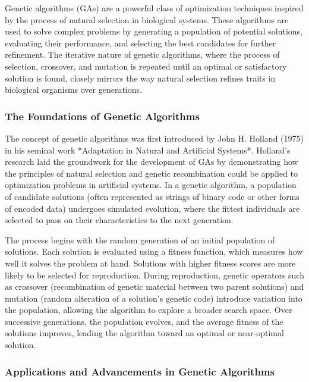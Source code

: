 \documentclass[12pt,twoside]{article}
\begin{document}
Genetic algorithms (GAs) are a powerful class of optimization techniques inspired by the process of natural selection in biological systems. These algorithms are used to solve complex problems by generating a population of potential solutions, evaluating their performance, and selecting the best candidates for further refinement. The iterative nature of genetic algorithms, where the process of selection, crossover, and mutation is repeated until an optimal or satisfactory solution is found, closely mirrors the way natural selection refines traits in biological organisms over generations.

\subsubsection{The Foundations of Genetic Algorithms}

The concept of genetic algorithms was first introduced by John H. Holland (1975) in his seminal work *Adaptation in Natural and Artificial Systems*. Holland’s research laid the groundwork for the development of GAs by demonstrating how the principles of natural selection and genetic recombination could be applied to optimization problems in artificial systems. In a genetic algorithm, a population of candidate solutions (often represented as strings of binary code or other forms of encoded data) undergoes simulated evolution, where the fittest individuals are selected to pass on their characteristics to the next generation.

The process begins with the random generation of an initial population of solutions. Each solution is evaluated using a fitness function, which measures how well it solves the problem at hand. Solutions with higher fitness scores are more likely to be selected for reproduction. During reproduction, genetic operators such as crossover (recombination of genetic material between two parent solutions) and mutation (random alteration of a solution’s genetic code) introduce variation into the population, allowing the algorithm to explore a broader search space. Over successive generations, the population evolves, and the average fitness of the solutions improves, leading the algorithm toward an optimal or near-optimal solution.

\subsubsection{Applications and Advancements in Genetic Algorithms}
\end{document}
